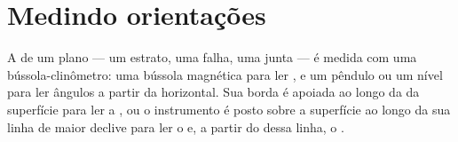 \section{Medindo orientações}

A  de um plano --- um estrato, uma falha, uma junta --- é medida com uma bússola-clinômetro: uma bússola magnética para ler , e um pêndulo ou um nível para ler ângulos a partir da horizontal. Sua borda é apoiada ao longo da  da superfície para ler a , ou o instrumento é posto sobre a superfície ao longo da sua linha de maior declive para ler o  e, a partir do  dessa linha, o .

